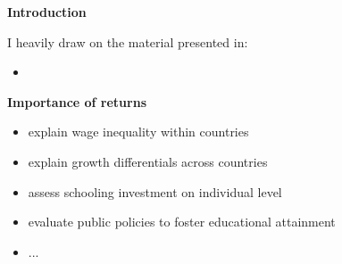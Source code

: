 \begin{frame}\begin{center}
\LARGE\textbf{Introduction}
\end{center}\end{frame}
\begin{frame} I heavily draw on the material presented in:

\begin{itemize}
\item {}
\end{itemize}

\end{frame}
\begin{frame}\textbf{Importance of returns}\vspace{0.3cm}

\begin{itemize}\setlength\itemsep{1em}
\item explain wage inequality within countries
\item explain growth differentials across countries
\item assess schooling investment on individual level
\item evaluate public policies to foster educational attainment
\item ...
\end{itemize}
\end{frame}

